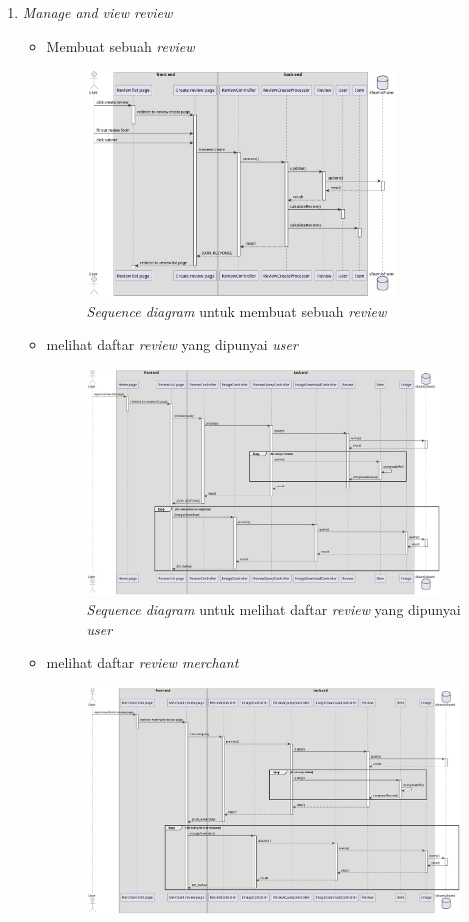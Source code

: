 \documentclass[a4paper]{article}
\begin{document}
\begin{enumerate}
\begin{enumerate}
        \item \textit{Manage and view review}
        \begin{itemize}
            \item Membuat sebuah \textit{review}
            \begin{figure}[h]
                \centering
                \includegraphics*[height=6cm]{./diagram/sequence diagram/16. review/create review/create review.png}
                \caption{\textit{Sequence diagram} untuk membuat sebuah \textit{review}}
            \end{figure}
            \item melihat daftar \textit{review} yang dipunyai \textit{user}
            \begin{figure}[h]
                \centering
                \includegraphics*[height=6cm]{./diagram/sequence diagram/16. review/view user review/view user review list.png}
                \caption{\textit{Sequence diagram} untuk melihat daftar \textit{review} yang dipunyai \textit{user}}
            \end{figure}
            \newpage
            \item melihat daftar \textit{review merchant}
            \begin{figure}[h]
                \centering
                \includegraphics*[height=6cm]{./diagram/sequence diagram/16. review/view merchant review/merchant review.png}

\end{figure}
\end{itemize}
\end{enumerate}
\end{enumerate}
\end{document}
